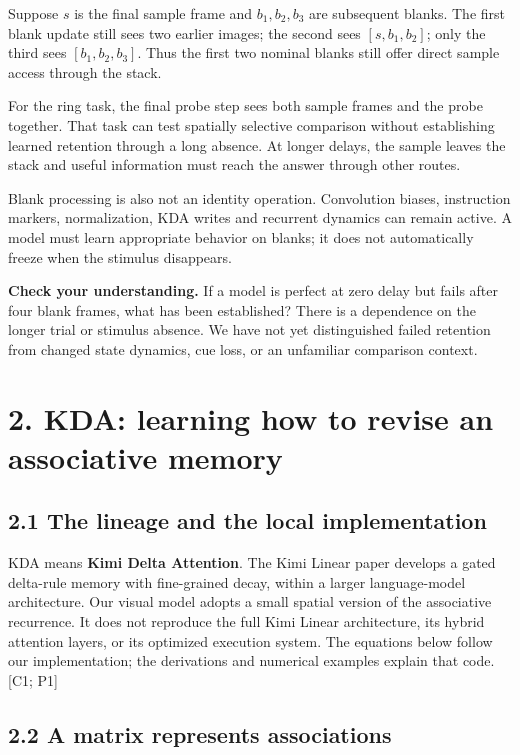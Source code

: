 \documentclass[
  11pt,
]{article}
\let\oldsubsection\subsection
\renewcommand{\subsection}{\Needspace{6\baselineskip}\oldsubsection}
\begin{document}
Suppose \(s\) is the final sample frame and \(b_1,b_2,b_3\) are
subsequent blanks. The first blank update still sees two earlier images;
the second sees \([s,b_1,b_2]\); only the third sees \([b_1,b_2,b_3]\).
Thus the first two nominal blanks still offer direct sample access
through the stack.

For the ring task, the final probe step sees both sample frames and the
probe together. That task can test spatially selective comparison
without establishing learned retention through a long absence. At longer
delays, the sample leaves the stack and useful information must reach
the answer through other routes.

Blank processing is also not an identity operation. Convolution biases,
instruction markers, normalization, KDA writes and recurrent dynamics
can remain active. A model must learn appropriate behavior on blanks; it
does not automatically freeze when the stimulus disappears.

\textbf{Check your understanding.} If a model is perfect at zero delay
but fails after four blank frames, what has been established? There is a
dependence on the longer trial or stimulus absence. We have not yet
distinguished failed retention from changed state dynamics, cue loss, or
an unfamiliar comparison context.

\newpage

\section{2. KDA: learning how to revise an associative
memory}\label{kda-learning-how-to-revise-an-associative-memory}

\subsection{2.1 The lineage and the local
implementation}\label{the-lineage-and-the-local-implementation}

KDA means \textbf{Kimi Delta Attention}. The Kimi Linear paper develops
a gated delta-rule memory with fine-grained decay, within a larger
language-model architecture. Our visual model adopts a small spatial
version of the associative recurrence. It does not reproduce the full
Kimi Linear architecture, its hybrid attention layers, or its optimized
execution system. The equations below follow our implementation; the
derivations and numerical examples explain that code. {[}C1; P1{]}

\subsection{2.2 A matrix represents
associations}\label{a-matrix-represents-associations}
\end{document}
